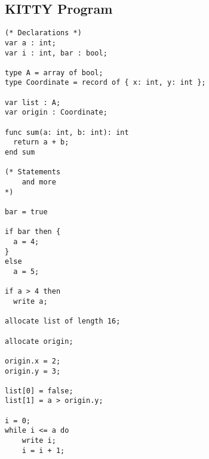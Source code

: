 \documentclass[a4paper]{article}
\begin{document}
\subsection{KITTY Program}
\begin{verbatim}
(* Declarations *)
var a : int;
var i : int, bar : bool;

type A = array of bool;
type Coordinate = record of { x: int, y: int };

var list : A;
var origin : Coordinate;

func sum(a: int, b: int): int
  return a + b;
end sum

(* Statements
    and more
*)

bar = true

if bar then {
  a = 4;
}
else
  a = 5;

if a > 4 then
  write a;

allocate list of length 16;

allocate origin;

origin.x = 2;
origin.y = 3;

list[0] = false;
list[1] = a > origin.y;

i = 0;
while i <= a do
    write i;
    i = i + 1;
\end{verbatim}
\end{document}
